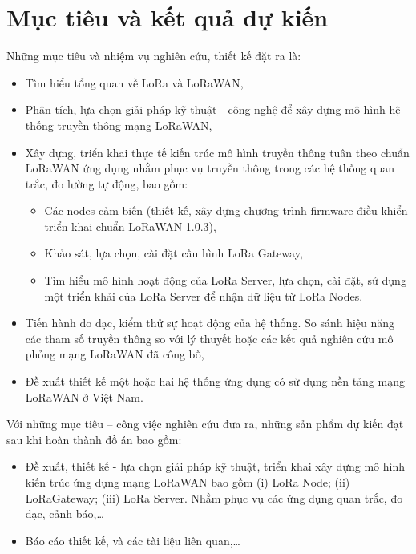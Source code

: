 \section{Mục tiêu và kết quả dự kiến}
Những mục tiêu và nhiệm vụ nghiên cứu, thiết kế đặt ra là:
\begin{itemize}
\item	Tìm hiểu tổng quan về LoRa và LoRaWAN,
\item	Phân tích, lựa chọn giải pháp kỹ thuật - công nghệ để xây dựng mô hình hệ thống truyền thông mạng LoRaWAN,
\item	Xây dựng, triển khai thực tế kiến trúc mô hình truyền thông tuân theo chuẩn LoRaWAN ứng dụng nhằm phục vụ truyền thông trong các hệ thống quan trắc, đo lường tự động, bao gồm:
	\begin{itemize}
	\item	Các nodes cảm biến (thiết kế, xây dựng chương trình firmware điều khiển triển khai chuẩn LoRaWAN 1.0.3),
    \item	Khảo sát, lựa chọn, cài đặt cấu hình LoRa Gateway,
    \item	Tìm hiểu mô hình hoạt động của LoRa Server, lựa chọn, cài đặt, sử dụng một triển khải của LoRa Server để nhận dữ liệu từ LoRa Nodes. 
	\end{itemize}
\item	Tiến hành đo đạc, kiểm thử sự hoạt động của hệ thống. So sánh hiệu năng các tham số truyền thông so với lý thuyết hoặc các kết quả nghiên cứu mô phỏng mạng LoRaWAN đã công bố,
\item	Đề xuất thiết kế một hoặc hai hệ thống ứng dụng có sử dụng nền tảng mạng LoRaWAN ở Việt Nam.

\end{itemize}
Với những mục tiêu – công việc nghiên cứu đưa ra, những sản phẩm dự kiến đạt sau khi hoàn thành đồ án bao gồm:
\begin{itemize}
\item	Đề xuất, thiết kế - lựa chọn giải pháp kỹ thuật, triển khai xây dựng mô hình kiến trúc ứng dụng mạng LoRaWAN bao gồm (i) LoRa Node; (ii) LoRaGateway; (iii) LoRa Server. Nhằm phục vụ các ứng dụng quan trắc, đo đạc, cảnh báo,…
\item	Báo cáo thiết kế, và các tài liệu liên quan,…
\end{itemize}



